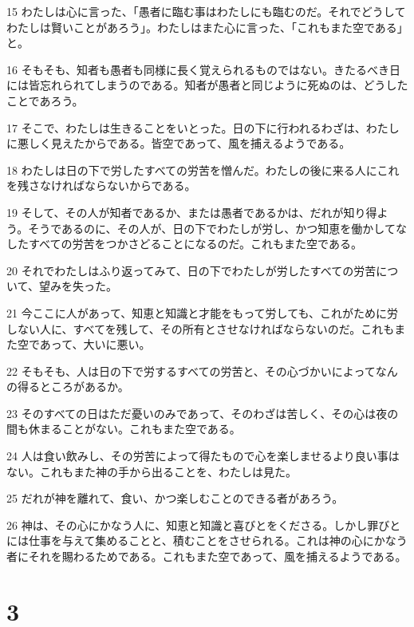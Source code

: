 \par 15 わたしは心に言った、「愚者に臨む事はわたしにも臨むのだ。それでどうしてわたしは賢いことがあろう」。わたしはまた心に言った、「これもまた空である」と。
\par 16 そもそも、知者も愚者も同様に長く覚えられるものではない。きたるべき日には皆忘れられてしまうのである。知者が愚者と同じように死ぬのは、どうしたことであろう。
\par 17 そこで、わたしは生きることをいとった。日の下に行われるわざは、わたしに悪しく見えたからである。皆空であって、風を捕えるようである。
\par 18 わたしは日の下で労したすべての労苦を憎んだ。わたしの後に来る人にこれを残さなければならないからである。
\par 19 そして、その人が知者であるか、または愚者であるかは、だれが知り得よう。そうであるのに、その人が、日の下でわたしが労し、かつ知恵を働かしてなしたすべての労苦をつかさどることになるのだ。これもまた空である。
\par 20 それでわたしはふり返ってみて、日の下でわたしが労したすべての労苦について、望みを失った。
\par 21 今ここに人があって、知恵と知識と才能をもって労しても、これがために労しない人に、すべてを残して、その所有とさせなければならないのだ。これもまた空であって、大いに悪い。
\par 22 そもそも、人は日の下で労するすべての労苦と、その心づかいによってなんの得るところがあるか。
\par 23 そのすべての日はただ憂いのみであって、そのわざは苦しく、その心は夜の間も休まることがない。これもまた空である。
\par 24 人は食い飲みし、その労苦によって得たもので心を楽しませるより良い事はない。これもまた神の手から出ることを、わたしは見た。
\par 25 だれが神を離れて、食い、かつ楽しむことのできる者があろう。
\par 26 神は、その心にかなう人に、知恵と知識と喜びとをくださる。しかし罪びとには仕事を与えて集めることと、積むことをさせられる。これは神の心にかなう者にそれを賜わるためである。これもまた空であって、風を捕えるようである。

\chapter{3}

